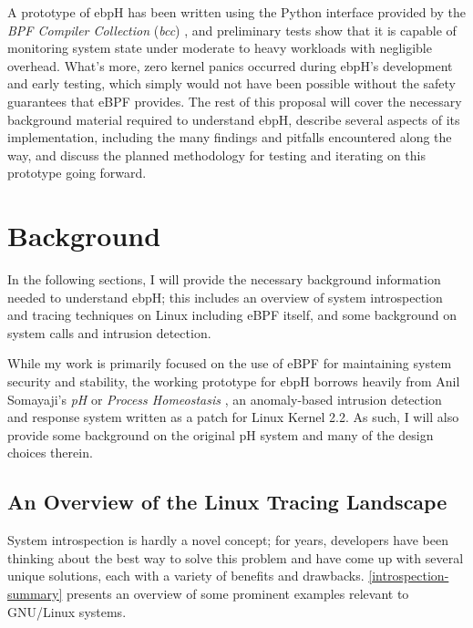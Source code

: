 \documentclass[
  12pt]{findlay}
\begin{document}
A prototype of ebpH has been written using the Python interface provided
by the \emph{BPF Compiler Collection} (\emph{bcc}) \autocite{bcc}, and
preliminary tests show that it is capable of monitoring system state
under moderate to heavy workloads with negligible overhead. What's more,
zero kernel panics occurred during ebpH's development and early testing,
which simply would not have been possible without the safety guarantees
that eBPF provides. The rest of this proposal will cover the necessary
background material required to understand ebpH, describe several
aspects of its implementation, including the many findings and pitfalls
encountered along the way, and discuss the planned methodology for
testing and iterating on this prototype going forward.

\hypertarget{background}{%
\section{Background}\label{background}}

In the following sections, I will provide the necessary background
information needed to understand ebpH; this includes an overview of
system introspection and tracing techniques on Linux including eBPF
itself, and some background on system calls and intrusion detection.

While my work is primarily focused on the use of eBPF for maintaining
system security and stability, the working prototype for ebpH borrows
heavily from Anil Somayaji's \emph{pH} or \emph{Process Homeostasis}
\autocite{soma02}, an anomaly-based intrusion detection and response
system written as a patch for Linux Kernel 2.2. As such, I will also
provide some background on the original pH system and many of the design
choices therein.

\hypertarget{an-overview-of-the-linux-tracing-landscape}{%
\subsection{An Overview of the Linux Tracing
Landscape}\label{an-overview-of-the-linux-tracing-landscape}}

\label{tracing-section}

System introspection is hardly a novel concept; for years, developers
have been thinking about the best way to solve this problem and have
come up with several unique solutions, each with a variety of benefits
and drawbacks. \autoref{introspection-summary} presents an overview of
some prominent examples relevant to GNU/Linux systems.
\end{document}
